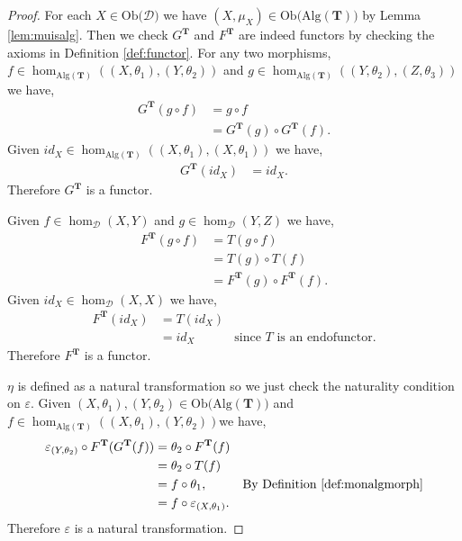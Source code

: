 \documentclass[11pt,a4paper]{article}
\theoremstyle{definition}
\newcommand\ho[3][]{\hom_{#1}(#2,#3)}
\newcommand\ob[1]{\mathrm{Ob(}#1\mathrm{)}}
\newcommand\cat[1]{\mathscr{#1}}
\newcommand{\alg}[1]{\mathrm{Alg}(\mathbf{#1})}
\numberwithin{equation}{section}
\begin{document}
\begin{proof}
    For each $X\in\ob{\cat{D}}$ we have $(X,\mu_X)\in\ob{\alg{T}}$ by Lemma \ref{lem:muisalg}. Then we check $G^{\mathbf{T}}$ and $F^{\mathbf{T}}$ are indeed functors by checking the axioms in Definition \ref{def:functor}. For any two morphisms, $f\in\ho[\alg{T}]{(X,\theta_1)}{(Y,\theta_2)}$ and $g\in\ho[\alg{T}]{(Y,\theta_2)}{(Z,\theta_3)}$ we have,
    \begin{align*}
        G^{\mathbf{T}}(g\circ f) &= g\circ f \\
        &=G^{\mathbf{T}}(g)\circ G^{\mathbf{T}}(f).
    \end{align*}
    Given $id_{X}\in\ho[\alg{T}]{(X,\theta_1)}{(X,\theta_1)}$ we have,
    \begin{align*}
        G^{\mathbf{T}}(id_X) &= id_{X}.
    \end{align*}
    Therefore $G^{\mathbf{T}}$ is a functor. 
    
    Given $f\in\ho[\cat{D}]{X}{Y}$ and $g\in\ho[\cat{D}]{Y}{Z}$ we have,
    \begin{align*}
        F^{\mathbf{T}}(g\circ f) &= T(g\circ f)\\
        &= T(g) \circ T(f) \\
        &= F^{\mathbf{T}}(g) \circ F^{\mathbf{T}}(f).
    \end{align*}
    Given $id_{X}\in\ho[\cat{D}]{X}{X}$ we have,
    \begin{align*}
        F^{\mathbf{T}}(id_{X}) &= T(id_{X}) \\
        &= id_{X} & \text{since $T$ is an endofunctor.}
    \end{align*}
    Therefore $F^{\mathbf{T}}$ is a functor.
    
    $\eta$ is defined as a natural transformation so we just check the naturality condition on $\varepsilon$. Given $(X,\theta_1),(Y,\theta_2)\in\ob{\alg{T}}$ and $f\in\ho[\alg{T}]{(X,\theta_1)}{(Y,\theta_2)}$we have,
    \begin{align*}
        \varepsilon_{(Y,\theta_2)} \circ F^{\mathbf{T}}(G^{\mathbf{T}}(f)) &= \theta_2 \circ F^{\mathbf{T}}(f) \\
        &= \theta_{2} \circ T(f) \\
        &= f\circ \theta_1, & \text{By Definition \ref{def:monalgmorph}}\\
        &= f \circ \varepsilon_{(X,\theta_1)}.
    \end{align*}
    Therefore $\varepsilon$ is a natural transformation.
    

\end{proof}
\end{document}
